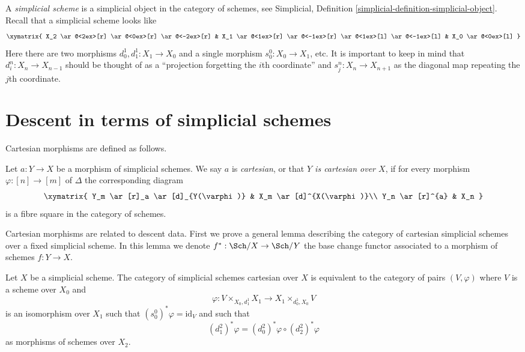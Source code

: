 \noindent
A {\it simplicial scheme} is a simplicial object in the category of schemes,
see Simplicial, Definition \ref{simplicial-definition-simplicial-object}.
Recall that a simplicial scheme looks like
$$
\xymatrix{
X_2
\ar@<2ex>[r]
\ar@<0ex>[r]
\ar@<-2ex>[r]
&
X_1
\ar@<1ex>[r]
\ar@<-1ex>[r]
\ar@<1ex>[l]
\ar@<-1ex>[l]
&
X_0
\ar@<0ex>[l]
}
$$
Here there are two morphisms $d^1_0, d^1_1 : X_1 \to X_0$
and a single morphism $s^0_0 : X_0 \to X_1$, etc.
It is important to keep in mind that $d^n_i : X_n \to X_{n - 1}$
should be thought of as a ``projection forgetting the
$i$th coordinate'' and $s^n_j : X_n \to X_{n + 1}$ as the diagonal
map repeating the $j$th coordinate.





\section{Descent in terms of simplicial schemes}
\label{section-simplicial-descent}

\noindent
Cartesian morphisms are defined as follows.

\begin{definition}
\label{definition-cartesian-morphism}
Let $a : Y \to X$ be a morphism of simplicial schemes.
We say $a$ is {\it cartesian}, or that {\it $Y$ is cartesian over $X$},
if for every morphism $\varphi : [n] \to [m]$ of $\Delta$ the corresponding
diagram
$$
\xymatrix{
Y_m \ar[r]_a \ar[d]_{Y(\varphi)} & X_m \ar[d]^{X(\varphi)}\\
Y_n \ar[r]^{a} & X_n
}
$$
is a fibre square in the category of schemes.
\end{definition}

\noindent
Cartesian morphisms are related to descent data. First we prove a general
lemma describing the category of cartesian simplicial schemes over a
fixed simplicial scheme. In this lemma we denote $f^* : \Sch/X \to \Sch/Y$
the base change functor associated to a morphism of schemes $f :Y \to X$.

\begin{lemma}
\label{lemma-characterize-cartesian-schemes}
Let $X$ be a simplicial scheme. The category of simplicial schemes cartesian
over $X$ is equivalent to the category of pairs $(V, \varphi)$
where $V$ is a scheme over $X_0$ and
$$
\varphi :
V \times_{X_0, d^1_1} X_1
\longrightarrow
X_1 \times_{d^1_0, X_0} V
$$
is an isomorphism over $X_1$ such that
$(s_0^0)^*\varphi = \text{id}_V$ and such that
$$
(d^2_1)^*\varphi = (d^2_0)^*\varphi \circ (d^2_2)^*\varphi
$$
as morphisms of schemes over $X_2$.
\end{lemma}


